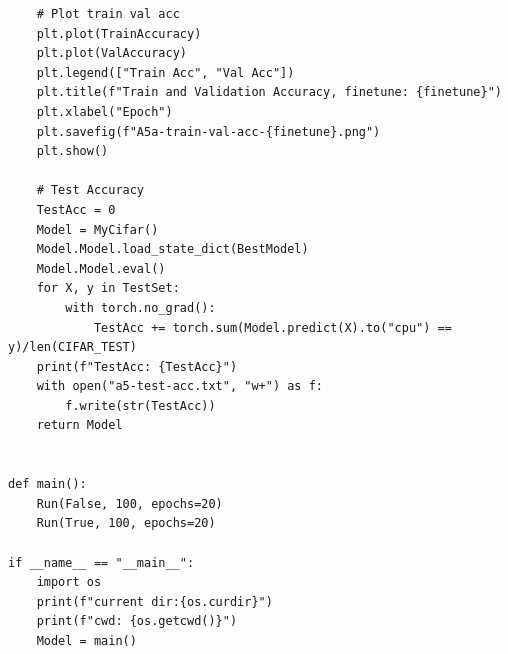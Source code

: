 \documentclass[]{article}
\begin{document}
\begin{lstlisting}
    # Plot train val acc
    plt.plot(TrainAccuracy)
    plt.plot(ValAccuracy)
    plt.legend(["Train Acc", "Val Acc"])
    plt.title(f"Train and Validation Accuracy, finetune: {finetune}")
    plt.xlabel("Epoch")
    plt.savefig(f"A5a-train-val-acc-{finetune}.png")
    plt.show()

    # Test Accuracy
    TestAcc = 0
    Model = MyCifar()
    Model.Model.load_state_dict(BestModel)
    Model.Model.eval()
    for X, y in TestSet:
        with torch.no_grad():
            TestAcc += torch.sum(Model.predict(X).to("cpu") == y)/len(CIFAR_TEST)
    print(f"TestAcc: {TestAcc}")
    with open("a5-test-acc.txt", "w+") as f:
        f.write(str(TestAcc))
    return Model


def main():
    Run(False, 100, epochs=20)
    Run(True, 100, epochs=20)

if __name__ == "__main__":
    import os
    print(f"current dir:{os.curdir}")
    print(f"cwd: {os.getcwd()}")
    Model = main()
        \end{lstlisting}
    
\end{document}
